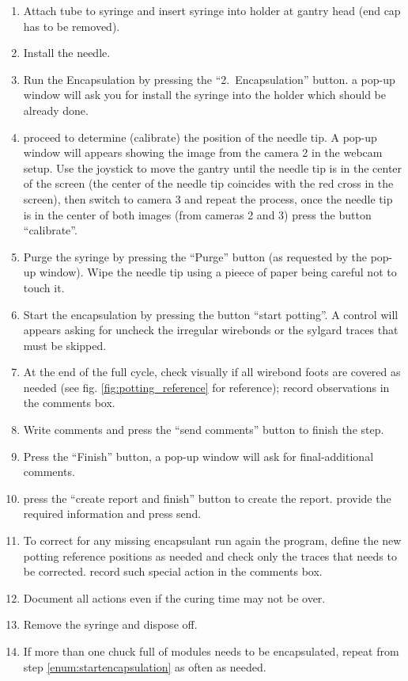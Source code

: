 \documentclass[12pt]{unlsilabsop}
\begin{document}
\begin{enumerate}
\begin{enumerate}
    \end{enumerate}
    \item Attach tube to syringe and insert syringe into holder at gantry head (end cap has to be removed).
    \item Install the needle.
    \item Run the Encapsulation by pressing the ``2.~Encapsulation'' button. a pop-up window will ask you for install the syringe into the holder which should be already done.
    \item proceed to determine (calibrate) the position of the needle tip. A pop-up window will appears showing the image from the camera 2 in the webcam setup. Use the joystick to move the gantry until the needle tip is in the center of the screen (the center of the needle tip coincides with the red cross in the screen), then switch to camera 3 and repeat the process, once the needle tip is in the center of both images (from cameras 2 and 3) press the button ``calibrate''.
    \item Purge the syringe by pressing the ``Purge'' button (as requested by the pop-up window). Wipe the needle tip using a pieece of paper being careful not to touch it. 
    \item Start the encapsulation by pressing the button ``start potting''. A control will appears asking for uncheck the irregular wirebonds or the sylgard traces that must be skipped.     
    \item At the end of the full cycle, check visually if all wirebond foots are covered as needed (see fig. \ref{fig:potting_reference} for reference); record observations in the comments box.
    \item Write comments and press the ``send comments'' button to finish the step. 
    \item Press the ``Finish'' button, a pop-up window will ask for final-additional comments.
    \item press the ``create report and finish'' button to create the report. provide the required information and press send.
    \item To correct for any missing encapsulant run again the program, define the new potting reference positions as needed and check only the traces that needs to be corrected. record such special action in the comments box.
    \item Document all actions even if the curing time may not be over.
    \item Remove the syringe and dispose off.   
    \item If more than one chuck full of modules needs to be encapsulated, repeat from step \ref{enum:startencapsulation} as often as needed.

\end{enumerate}
\end{document}
